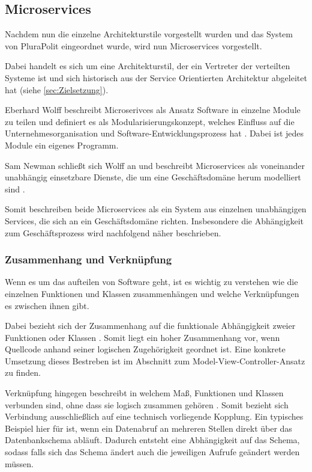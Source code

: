 \subsection{Microservices}

Nachdem nun die einzelne Architekturstile vorgestellt wurden und das System von PluraPolit eingeordnet wurde, wird nun Microservices vorgestellt.

Dabei handelt es sich um eine Architekturstil, der ein Vertreter der verteilten Systeme ist und sich historisch aus der Service Orientierten Architektur abgeleitet hat (siehe \cref{sec:Zielsetzung}).

Eberhard Wolff beschreibt Microserivces als Ansatz Software in einzelne Module zu teilen und definiert es als Modularisierungskonzept, welches Einfluss auf die Unternehmesorganisation und Software-Entwicklungsprozess hat \parencite[vgl.][Kap. 1.1]{wolff_microservices_2018}. Dabei ist jedes Module ein eigenes Programm.

Sam Newman schließt sich Wolff an und beschreibt Microservices als voneinander unabhängig einsetzbare Dienste, die um eine Geschäftsdomäne herum modelliert sind \parencite[vgl.][Kap. 2.1]{newman_monolith_2019}.

Somit beschreiben beide Microservices als ein System aus einzelnen unabhängigen Services, die sich an ein Geschäftsdomäne richten. Insbesondere die Abhängigkeit zum Geschäftsprozess wird nachfolgend näher beschrieben.


\subsubsection{Zusammenhang und Verknüpfung}

Wenn es um das aufteilen von Software geht, ist es wichtig zu verstehen wie die einzelnen Funktionen und Klassen zusammenhängen und welche Verknüpfungen es zwischen ihnen gibt.

Dabei bezieht sich der Zusammenhang auf die funktionale Abhängigkeit zweier Funktionen oder Klassen \parencite[vgl.][Kap. 2.3.1]{newman_monolith_2019}. Somit liegt ein hoher Zusammenhang vor, wenn Quellcode anhand seiner logischen Zugehörigkeit geordnet ist. Eine konkrete Umsetzung dieses Bestreben ist im Abschnitt zum Model-View-Controller-Ansatz zu finden.

Verknüpfung hingegen beschreibt in welchem Maß, Funktionen und Klassen verbunden sind, ohne dass sie logisch zusammen gehören \parencite[vgl.][Kap. 2.3.2]{newman_monolith_2019}. Somit bezieht sich Verbindung ausschließlich auf eine technisch vorliegende Kopplung. Ein typisches Beispiel hier für ist, wenn ein Datenabruf an mehreren Stellen direkt über das Datenbankschema abläuft. Dadurch entsteht eine Abhängigkeit auf das Schema, sodass falls sich das Schema ändert auch die jeweiligen Aufrufe geändert werden müssen.

